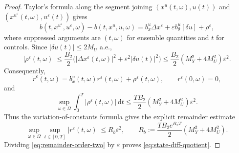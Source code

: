 \documentclass[11pt]{amsart}
\numberwithin{equation}{section} %
\newcommand{\dd}{\mathrm{d}}
\theoremstyle{remark}
\begin{document}
\begin{proof}
Taylor's formula along the segment joining
$(x^u(t,\omega),u(t))$ and
$(x^{u^\varepsilon}(t,\omega),u^\varepsilon(t))$ gives
\[
b(t,x^{u^\varepsilon},u^\varepsilon,\omega)
-b(t,x^u,u,\omega)
=b_x^u\Delta x^\varepsilon
+\varepsilon b_\theta^u[\delta u]+\rho^\varepsilon,
\]
where suppressed arguments are $(t,\omega)$ for ensemble quantities
and $t$ for controls. Since $|\delta u(t)|\le2M_U$ a.e.,
\begin{equation}
\label{eq:taylor-remainder-bound}
|\rho^\varepsilon(t,\omega)|
\le\frac{B_2}{2}
\bigl(|\Delta x^\varepsilon(t,\omega)|^2
+\varepsilon^2|\delta u(t)|^2\bigr)
\le\frac{B_2}{2}(M_Y^2+4M_U^2)\varepsilon^2.
\end{equation}
Consequently,
\begin{equation}
\label{eq:remainder-dynamics}
\dot r^\varepsilon(t, \omega)=b_x^u(t, \omega) r^\varepsilon(t, \omega)+\rho^\varepsilon(t, \omega),
\qquad r^\varepsilon(0,\omega)=0,
\end{equation}
and
\begin{equation}
\label{eq:rho-order-two}
\sup_{\omega\in\Omega}\int_0^T
|\rho^\varepsilon(t,\omega)|\,\dd t
\le\frac{TB_2}{2}(M_Y^2+4M_U^2)\varepsilon^2.
\end{equation}
Thus the variation-of-constants formula gives the explicit remainder
estimate
\begin{equation}
\label{eq:remainder-order-two}
\sup_{\omega\in\Omega}\sup_{t\in[0,T]}
|r^\varepsilon(t,\omega)|
\le R_b\varepsilon^2,
\qquad
R_b:=\frac{TB_2e^{B_xT}}{2}(M_Y^2+4M_U^2).
\end{equation}
Dividing \eqref{eq:remainder-order-two} by $\varepsilon$ proves \eqref{eq:state-diff-quotient}.


\end{proof}
\end{document}
